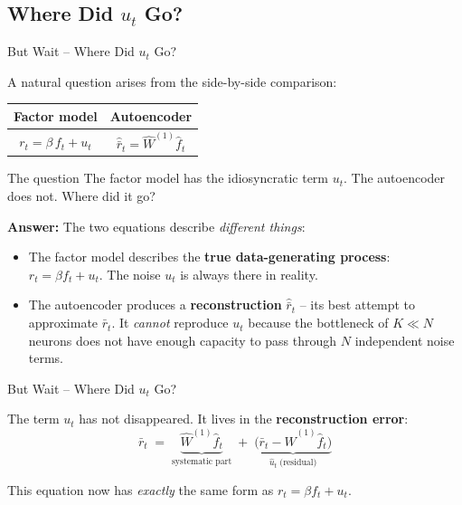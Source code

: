 \documentclass[aspectratio=169]{beamer}
\begin{document}
\subsection{Where Did $u_t$ Go?}
%
\begin{frame}{But Wait -- Where Did $u_t$ Go?}

A natural question arises from the side-by-side comparison:

\vspace{0.3em}

\begin{center}
\renewcommand{\arraystretch}{1.5}
\begin{tabular}{c @{\hskip 2em} c}
\textbf{Factor model} & \textbf{Autoencoder} \\
\hline
$r_t = \beta \, f_t + u_t$ & $\hat{\bar{r}}_t = \hat{W}^{(1)} \hat{f}_t$ \\
\hline
\end{tabular}
\end{center}

\vspace{0.3em}

\begin{alertblock}{The question}
The factor model has the idiosyncratic term $u_t$. The autoencoder does not. Where did it go?
\end{alertblock}

\vspace{0.3em}

\textbf{Answer:} The two equations describe \textit{different things}:
\begin{itemize}
    \item The factor model describes the \textbf{true data-generating process}: $r_t = \beta f_t + u_t$. The noise $u_t$ is always there in reality.
    \item The autoencoder produces a \textbf{reconstruction} $\hat{\bar{r}}_t$ -- its best attempt to approximate $\bar{r}_t$. It \textit{cannot} reproduce $u_t$ because the bottleneck of $K \ll N$ neurons does not have enough capacity to pass through $N$ independent noise terms.
\end{itemize}
\end{frame}
%
%
\begin{frame}{But Wait -- Where Did $u_t$ Go?}

The term $u_t$ has not disappeared. It lives in the \textbf{reconstruction error}:
\[
\bar{r}_t \;=\; \underbrace{\hat{W}^{(1)}\hat{f}_t}_{\text{systematic part}} \;+\; \underbrace{\bigl(\bar{r}_t - \hat{W}^{(1)}\hat{f}_t\bigr)}_{\hat{u}_t \;\text{(residual)}}
\]

This equation now has \textit{exactly} the same form as $r_t = \beta f_t + u_t$.

\end{frame}
\end{document}
